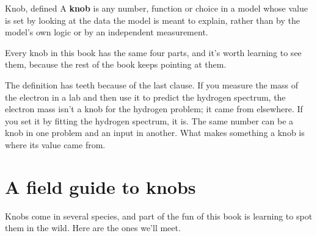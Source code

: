 \begin{knobbox}{Knob, defined}
A \textbf{knob} is any number, function or choice in a model whose value is set by looking at the data the model is meant to explain, rather than by the model's own logic or by an independent measurement.
\end{knobbox}

Every knob in this book has the same four parts, and it's worth learning to see them, because the rest of the book keeps pointing at them.





The definition has teeth because of the last clause. If you measure the mass of the electron in a lab and then use it to predict the hydrogen spectrum, the electron mass isn't a knob for the hydrogen problem; it came from elsewhere. If you set it by fitting the hydrogen spectrum, it is. The same number can be a knob in one problem and an input in another. What makes something a knob is where its value came from.

\section{A field guide to knobs}

Knobs come in several species, and part of the fun of this book is learning to spot them in the wild. Here are the ones we'll meet.




